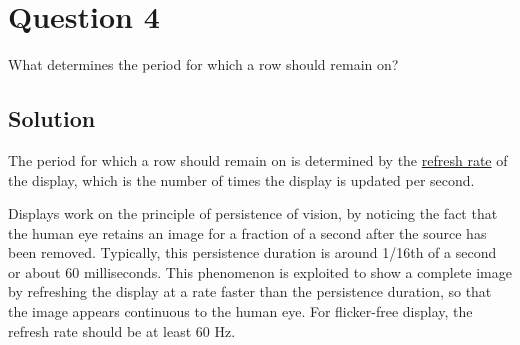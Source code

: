 \section*{Question 4}

What determines the period for which a row should remain on?

\subsection*{Solution}

The period for which a row should remain on is determined by the \underline{refresh rate} of the display, which is the number of times the display is updated per second.

Displays work on the principle of persistence of vision, by noticing the fact that the human eye retains an image for a fraction of a second after the source has been removed.
Typically, this persistence duration is around 1/16th of a second or about 60 milliseconds.
This phenomenon is exploited to show a complete image by refreshing the display at a rate faster than the persistence duration, so that the image appears continuous to the human eye.
For flicker-free display, the refresh rate should be at least 60 Hz.
